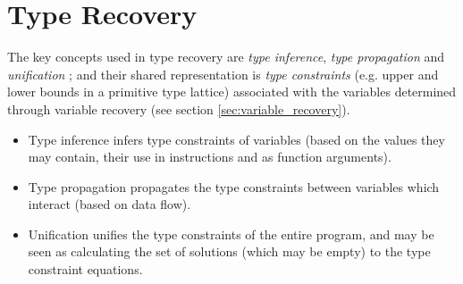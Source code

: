 
\section{Type Recovery}




The key concepts used in type recovery are \textit{type inference}, \textit{type propagation} and \textit{unification} \cite{mycroft_type_based_decompilation}; and their shared representation is \textit{type constraints} (e.g. upper and lower bounds in a primitive type lattice) associated with the variables determined through variable recovery (see section \ref{sec:variable_recovery}).

\begin{itemize}
	\item Type inference infers type constraints of variables (based on the values they may contain, their use in instructions and as function arguments).
	\item Type propagation propagates the type constraints between variables which interact (based on data flow).
	\item Unification unifies the type constraints of the entire program, and may be seen as calculating the set of solutions (which may be empty) to the type constraint equations.
\end{itemize}






%
